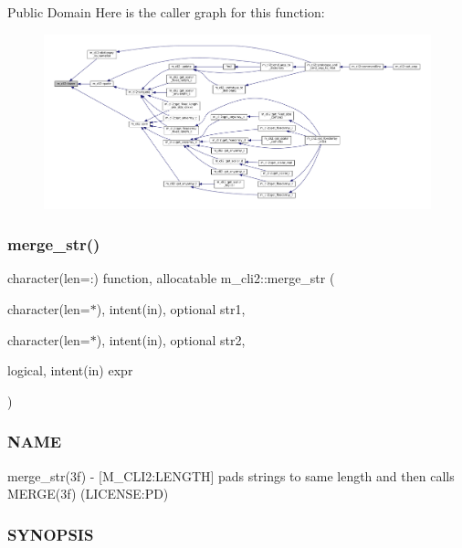 Public Domain Here is the caller graph for this function\+:\nopagebreak
\begin{figure}[H]
\begin{center}
\leavevmode
\includegraphics[width=350pt]{namespacem__cli2_a6d2d93ab8471667e632bf7a0e95ebd13_icgraph}
\end{center}
\end{figure}
\mbox{\label{namespacem__cli2_a8e172feb2e4ae4d21d4fceb4e54f593c}} 
\subsubsection{\texorpdfstring{merge\+\_\+str()}{merge\_str()}}
{\footnotesize\ttfamily character(len=\+:) function, allocatable m\+\_\+cli2\+::merge\+\_\+str (\begin{DoxyParamCaption}\item[{character(len=$\ast$), intent(in), optional}]{str1,  }\item[{character(len=$\ast$), intent(in), optional}]{str2,  }\item[{logical, intent(in)}]{expr }\end{DoxyParamCaption})\hspace{0.3cm}{\ttfamily [private]}}



\subsubsection*{N\+A\+ME}

merge\+\_\+str(3f) -\/ \mbox{[}M\+\_\+\+C\+L\+I2\+:L\+E\+N\+G\+TH\mbox{]} pads strings to same length and then calls M\+E\+R\+G\+E(3f) (L\+I\+C\+E\+N\+SE\+:PD) 

\subsubsection*{S\+Y\+N\+O\+P\+S\+IS}

